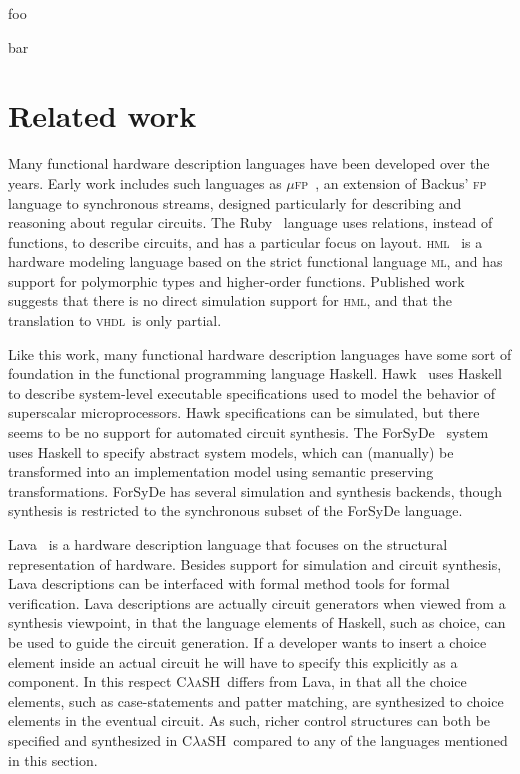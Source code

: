 \documentclass[conference,pdf,a4paper,10pt,final,twoside,twocolumn]{IEEEtran}
\def\VHDL{\textsc{vhdl}}
\def\CLaSH{\textsc{C$\lambda$aSH}}
\begin{document}
foo\par bar

\section{Related work}
Many functional hardware description languages have been developed over the years. Early work includes such languages as \textsc{$\mu$fp}~\cite{muFP}, an extension of Backus' \textsc{fp} language to synchronous streams, designed particularly for describing and reasoning about regular circuits. The Ruby~\cite{Ruby} language uses relations, instead of functions, to describe circuits, and has a particular focus on layout. \textsc{hml}~\cite{HML2} is a hardware modeling language based on the strict functional language \textsc{ml}, and has support for polymorphic types and higher-order functions. Published work suggests that there is no direct simulation support for \textsc{hml}, and that the translation to \VHDL\ is only partial.

Like this work, many functional hardware description languages have some sort of foundation in the functional programming language Haskell. Hawk~\cite{Hawk1} uses Haskell to describe system-level executable specifications used to model the behavior of superscalar microprocessors. Hawk specifications can be simulated, but there seems to be no support for automated circuit synthesis. The ForSyDe~\cite{ForSyDe2} system uses Haskell to specify abstract system models, which can (manually) be transformed into an implementation model using semantic preserving transformations. ForSyDe has several simulation and synthesis backends, though synthesis is restricted to the synchronous subset of the ForSyDe language.

Lava~\cite{Lava} is a hardware description language that focuses on the structural representation of hardware. Besides support for simulation and circuit synthesis, Lava descriptions can be interfaced with formal method tools for formal verification. Lava descriptions are actually circuit generators when viewed from a synthesis viewpoint, in that the language elements of Haskell, such as choice, can be used to guide the circuit generation. If a developer wants to insert a choice element inside an actual circuit he will have to specify this explicitly as a component. In this respect \CLaSH\ differs from Lava, in that all the choice elements, such as case-statements and patter matching, are synthesized to choice elements in the eventual circuit. As such, richer control structures can both be specified and synthesized in \CLaSH\ compared to any of the languages mentioned in this section.
\end{document}
